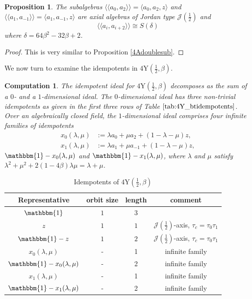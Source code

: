 \documentclass[11pt, a4paper]{article}
\theoremstyle{plain}
\newtheorem{proposition}[theorem]{Proposition}
\newtheorem{computation}[theorem]{Computation}
\theoremstyle{definition}
\newcommand\bt{\beta}
\newcommand\lm{\lambda}
\newcommand\cJ{\mathcal{J}}
\newcommand\la{\langle}
\newcommand\ra{\rangle}
\newcommand\lla{\langle\!\langle}
\newcommand\rra{\rangle\!\rangle}
\newcommand{\Y}{\mathrm{Y}}
\newcommand{\0}{\overline{0}}
\newcommand{\2}{\overline{2}}
\newcommand{\1}{\mathbbm{1}}
\begin{document}
\begin{proposition}\label{4Ybtsub}
	The subalgebras $ \lla a_0, a_{2} \rra = \la a_0,a_{2}, z \ra$ and $ \lla a_1, a_{-1} \rra = \la a_1,a_{-1},z \ra$ are axial algebras of Jordan type $\cJ(\tfrac{1}{2})$ and
	\[
	\lla a_i, a_{i+2}\rra \cong S(\delta)
	\]
where $\delta = 64\bt^2 -32\bt + 2$.
\end{proposition}
\begin{proof}
This is very similar to Proposition \ref{4Adoublesub}.
\end{proof}

We now turn to examine the idempotents in $4\Y(\tfrac{1}{2}, \bt)$. 
 
\begin{computation}\label{4Ybtcomp}
The idempotent ideal for $4\Y(\frac{1}{2}, \bt)$ decomposes as the sum of a $0$- and a $1$-dimensional ideal.  The $0$-dimensional ideal has three non-trivial idempotents as given in the first three rows of Table $\ref{tab:4Y_btidempotents}$.  Over an algebraically closed field, the $1$-dimensional ideal comprises four infinite families of idempotents
\begin{align*}
x_0(\lm, \mu) &:= \lm a_0 + \mu a_2 + (1-\lm-\mu)z, \\
x_1(\lm, \mu) &:= \lm a_1 + \mu a_{-1} + (1-\lm-\mu)z,
\end{align*}
$\1-x_0(\lm, \mu)$ and $\1-x_1(\lm,\mu)$, where $\lm$ and $\mu$ satisfy $\lm^2 + \mu^2 + 2(1-4\bt)\lm\mu = \lm+\mu$.
\end{computation}

\begin{table}[h!tb]
\centering
	\begin{tabular}{cccc}
		\hline
		Representative & orbit size & length & comment \\
		\hline
		$\1$ & $1$ &  $3$ &  \\
		$z$ & $1$ &  $1$ & $\cJ(\tfrac{1}{2})$-axis, $\tau_{c} = \tau_0\tau_1$ \\
		$\1-z$ & $1$ &  $2$ & $\cJ(\tfrac{1}{2})$-axis, $\tau_{c} = \tau_0\tau_1$  \\
		$x_0(\lm, \mu)$ & - & 1  & infinite family \\
		$\1 - x_0(\lm, \mu)$ & - & 2  & infinite family \\
		$x_1(\lm, \mu)$ & - &  1 & infinite family \\
		$\1 - x_1(\lm, \mu)$ & - & 2  & infinite family \\
	\end{tabular}
	\caption{Idempotents of $4\Y(\tfrac{1}{2},\bt)$}\label{tab:4Y_btidempotents}
\end{table}
\end{document}
